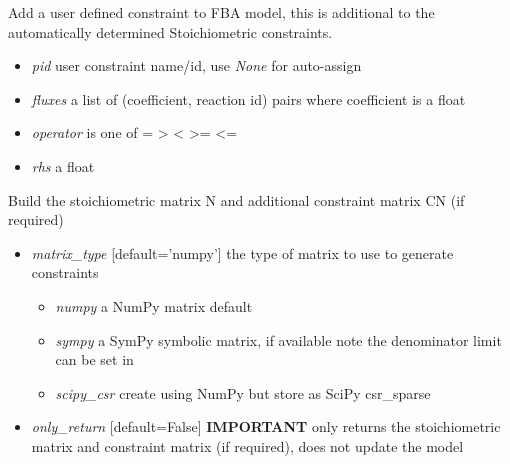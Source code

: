 \documentclass[a4paper,11pt,english]{sphinxmanual}
\begin{document}
\begin{fulllineitems}
\begin{fulllineitems}
\label{modules_doc:cbmpy.CBModel.Model.addUserConstraint}
Add a user defined constraint to FBA model, this is additional to the automatically determined Stoichiometric constraints.
\begin{itemize}
\item {} 
\emph{pid} user constraint name/id, use \emph{None} for auto-assign

\item {} 
\emph{fluxes} a list of (coefficient, reaction id) pairs where coefficient is a float

\item {} 
\emph{operator} is one of = \textgreater{} \textless{} \textgreater{}= \textless{}=

\item {} 
\emph{rhs} a float

\end{itemize}

\end{fulllineitems}


\begin{fulllineitems}
\label{modules_doc:cbmpy.CBModel.Model.buildStoichMatrix}
Build the stoichiometric matrix N and additional constraint matrix CN (if required)
\begin{itemize}
\item {} 
\emph{matrix\_type} {[}default='numpy'{]} the type of matrix to use to generate constraints
\begin{itemize}
\item {} 
\emph{numpy} a NumPy matrix default

\item {} 
\emph{sympy} a SymPy symbolic matrix, if available note the denominator limit can be set in 

\item {} 
\emph{scipy\_csr} create using NumPy but store as SciPy csr\_sparse

\end{itemize}

\end{itemize}
\begin{itemize}
\item {} 
\emph{only\_return} {[}default=False{]} \textbf{IMPORTANT} only returns the stoichiometric matrix and constraint matrix (if required),
does not update the model


\end{itemize}
\end{fulllineitems}
\end{fulllineitems}
\end{document}
